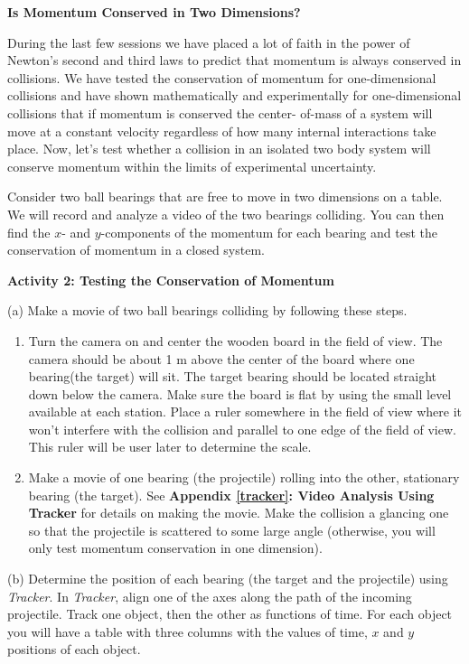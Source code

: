 \textbf{Is Momentum Conserved in Two Dimensions? }

During the last few sessions we have placed a lot of faith in the power of Newton's
second and third laws to predict that momentum is always conserved in collisions.
We have tested the conservation of momentum for one-dimensional collisions and
have shown mathematically and experimentally for one-dimensional collisions
that if momentum is conserved the center- of-mass of a system will move at a
constant velocity regardless of how many internal interactions take place. Now,
let's test whether a collision in an isolated two body system will conserve
momentum within the limits of experimental uncertainty. 

Consider two ball bearings that are free to move in two dimensions on a table.
We will record and analyze a video of the two bearings colliding. You can then
find the $x$- and $y$-components of the momentum for each bearing and test the 
conservation of momentum in a closed system. 

\textbf{Activity 2: Testing the Conservation of Momentum }

(a) Make a movie of two ball bearings colliding by following these steps. 

\begin{enumerate}
\item Turn the camera on and center the wooden board in the field of view. The camera
should be about 1 m above the center of the board where one bearing(the target)
will sit. The target bearing should be located straight down below the camera.
 Make sure the board is flat by using the small level available at each station. 
 Place a ruler somewhere
in the field of view where it won't interfere with the collision and parallel
to one edge of the field of view. This ruler will be user later to determine
the scale. 
\item Make a movie of one bearing (the projectile) rolling into the other, stationary
bearing (the target). See \textbf{Appendix \ref{tracker}: Video Analysis Using Tracker} 
for details on making the movie. Make the collision a glancing one so that the 
projectile is scattered to some large angle (otherwise, you will only test 
momentum conservation in one dimension).
\end{enumerate}
(b) Determine the position of each bearing (the target and the projectile) 
using \textit{Tracker}. In \textit{Tracker}, align one of the axes along the 
path of the incoming projectile. Track one object, then the other as functions 
of time. For each object you will have a table with three columns with the 
values of time, $x$ and $y$ positions of each object.
\vspace{5mm}


